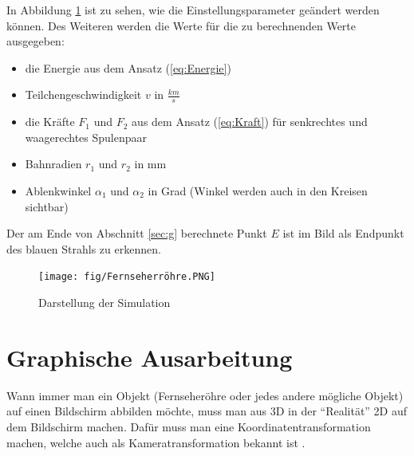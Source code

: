 In Abbildung \ref{fig:meineSimulation} ist zu sehen, wie die Einstellungsparameter geändert werden können. 
Des Weiteren werden die Werte für die zu berechnenden Werte ausgegeben:
\begin{itemize}
    \item die Energie aus dem Ansatz (\ref{eq:Energie})
    \item Teilchengeschwindigkeit $v$ in $\frac{km}{s}$
    \item die Kräfte $F_1$ und $F_2$ aus dem Ansatz (\ref{eq:Kraft}) für senkrechtes und waagerechtes Spulenpaar
    \item Bahnradien $r_1$ und $r_2$ in mm 
    \item Ablenkwinkel $\alpha_1$ und $\alpha_2$ in Grad (Winkel werden auch in den Kreisen sichtbar)
\end{itemize}
Der am Ende von Abschnitt \ref{sec:g} berechnete Punkt $E$ ist im Bild als Endpunkt des blauen Strahls zu erkennen.

\begin{figure}[h]
    \centering
    \texttt{[image: fig/Fernseherröhre.PNG]}
    \caption{Darstellung der Simulation}
    \label{fig:meineSimulation}
\end{figure}

\pagebreak
\section{Graphische Ausarbeitung}
Wann immer man ein Objekt (Fernseheröhre oder jedes andere mögliche Objekt) auf einen Bildschirm abbilden möchte, muss man aus 3D in der "`Realität"' 2D auf dem Bildschirm machen. Dafür muss man eine Koordinatentransformation machen, welche auch als Kameratransformation bekannt ist \cite{Kameratransformation}.

